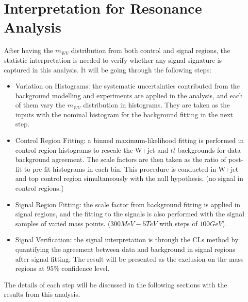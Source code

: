 \chapter{Interpretation for Resonance Analysis}
\label{Ch:resonance_stat}
After having the $m_{WV}$ distribution from both control and signal regions, the statistic interpretation is needed to verify whether any signal signature is captured in this analysis. It will be going through the following steps:

\begin{itemize}
	\item{Variation on Histograms}: the systematic uncertainties contributed from the background modelling and experiments are applied in the analysis, and each of them vary the $m_{WV}$ distribution in histograms. They are taken as the inputs with the nominal histogram for the background fitting in the next step.

	\item{Control Region Fitting}: a binned maximum-likelihood fitting is performed in control region histograms to rescale the W+jet and $t\bar{t}$ backgrounds for data-background agreement. The scale factors are then taken as the ratio of post-fit to pre-fit histograms in each bin. This procedure is conducted in W+jet and top control region simultaneously with the null hypothesis. (no signal in control regions.)

	\item{Signal Region Fitting}: the scale factor from background fitting is applied in signal regions, and the fitting to the signals is also performed with the signal samples of varied mass points. ($300MeV-5TeV$ with steps of $100GeV$).

	\item{Signal Verification}: the signal interpretation is through the CLs method by quantifying the agreement between data and background in signal regions after signal fitting. The result will be presented as the exclusion on the mass regions at $95\%$ confidence level.
\end{itemize}
The details of each step will be discussed in the following sections with the results from this analysis. 
